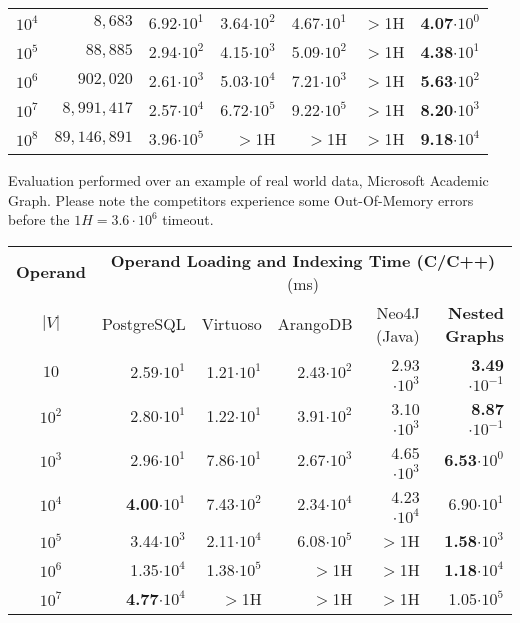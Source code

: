 \documentclass[a0,portrait]{a0poster}
\begin{document}
\begin{multicols}{2}
\begin{center}
\begin{tabular}{@{}cr|rrrr|r@{}}
	$10^4$ & $8,683$  & 6.92$\cdot 10^1$ & 3.64$\cdot 10^2$ & 4.67$\cdot 10^1$ &  $>$1H & \textbf{4.07}$\cdot 10^0$\\
	$10^5$ & $88,885$  & 2.94$\cdot 10^2$ & 4.15$\cdot 10^3$ & 5.09$\cdot 10^2$ &  $>$1H & \textbf{4.38}$\cdot 10^1$ \\
	$10^6$ & $902,020$  & 2.61$\cdot 10^3$ & 5.03$\cdot 10^4$ & 7.21$\cdot 10^3$ & $>$1H & \textbf{5.63}$\cdot 10^2$\\
	$10^7$ & $8,991,417$  & 2.57$\cdot 10^4$ & 6.72$\cdot 10^5$ & 9.22$\cdot 10^5$ & $>$1H & \textbf{8.20}$\cdot 10^3$\\
	$10^8$ & $89,146,891$  & 3.96$\cdot 10^5$ & $>$1H & $>$1H & $>$1H & \textbf{9.18}$\cdot 10^4$\\
	\bottomrule
\end{tabular}
\end{center}
\medskip

Evaluation performed over an example of real world data, Microsoft Academic Graph. Please note the competitors experience some Out-Of-Memory errors before the $1H=3.6\cdot 10^6$ timeout.

\begin{center}

\begin{tabular}{@{}c|rrrr|r@{}}
	\toprule
	\multicolumn{1}{c}{\textbf{Operand}} & \multicolumn{5}{|c}{\textbf{Operand Loading and Indexing Time (C/C++)} (ms)}  \\
	$|V|$  & {PostgreSQL} & {Virtuoso} & {ArangoDB}  &  {Neo4J (Java)} & {\textbf{Nested Graphs}}  \\
	\midrule
	$10$   & 2.59$\cdot 10^1$   & 1.21$\cdot 10^1$  & 2.43$\cdot 10^2$ &  2.93$\cdot 10^3$ & \textbf{3.49}$\cdot 10^{-1}$\\
	$10^2$  & 2.80$\cdot 10^1$  & 1.22$\cdot 10^1$  & 3.91$\cdot 10^2$ & 3.10$\cdot 10^3$  & \textbf{8.87}$\cdot 10^{-1}$\\
	$10^3$  & 2.96$\cdot 10^1$  & 7.86$\cdot 10^1$  & 2.67$\cdot 10^3$ & 4.65$\cdot 10^3$ & \textbf{6.53}$\cdot 10^0$\\
	$10^4$   & \textbf{4.00}$\cdot 10^1$ & 7.43$\cdot 10^2$  & 2.34$\cdot 10^4$ & 4.23$\cdot 10^4$ & 6.90$\cdot 10^1$\\
	$10^5$   & 3.44$\cdot 10^3$ & 2.11$\cdot 10^4$  & 6.08$\cdot 10^5$ & $>$1H & \textbf{1.58}$\cdot 10^3$ \\
	$10^6$  & 1.35$\cdot 10^4$  & 1.38$\cdot 10^5$  & $>$1H & $>$1H & \textbf{1.18}$\cdot 10^4$\\
	$10^7$   & \textbf{4.77}$\cdot 10^4$ &              $>$1H  & $>$1H & $>$1H & 1.05$\cdot 10^5$\\
	\bottomrule
\end{tabular}


\end{center}
\end{multicols}
\end{document}
